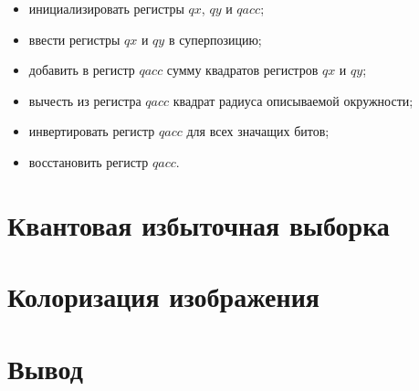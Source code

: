 \begin{itemize}
	\item инициализировать регистры $qx$, $qy$ и $qacc$;
	\item ввести регистры $qx$ и $qy$ в суперпозицию;
	\item добавить в регистр $qacc$ сумму квадратов регистров $qx$ и $qy$;
	\item вычесть из регистра $qacc$ квадрат радиуса описываемой окружности;
	\item инвертировать регистр $qacc$ для всех значащих битов;
	\item восстановить регистр $qacc$.
\end{itemize}


\section{Квантовая избыточная выборка}
\section{Колоризация изображения}

\section*{Вывод}

